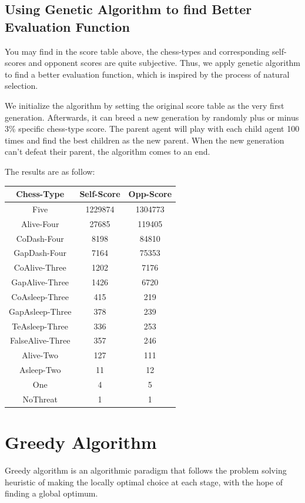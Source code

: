\documentclass[12pt,a4paper]{article}
\begin{document}
\subsection{Using Genetic Algorithm to find Better Evaluation Function}
You may find in the score table above, the chess-types and corresponding self-scores and opponent scores are quite subjective. Thus, we apply genetic algorithm to find a better evaluation function, which is inspired by the process of natural selection.

We initialize the algorithm by setting the original score table as the very first generation. Afterwards, it can breed a new generation by randomly plus or minus 3\% specific chess-type score. The parent agent will play with each child agent 100 times and find the best children as the new parent. When the new generation can't defeat their parent, the algorithm comes to an end.

The results are as follow:
\begin{table}[h]
\centering
\begin{tabular}{c|c|c}
\hline
Chess-Type&Self-Score&Opp-Score  \\
\hline
Five&1229874&1304773\\
Alive-Four&27685&119405\\
CoDash-Four&8198&84810\\
GapDash-Four&7164&75353\\
CoAlive-Three&1202&7176\\
GapAlive-Three&1426&6720\\
CoAsleep-Three&415&219\\
GapAsleep-Three&378&239\\
TeAsleep-Three&336&253\\
FalseAlive-Three&357&246\\
Alive-Two&127&111\\
Asleep-Two&11&12\\
One&4&5\\
NoThreat&1&1\\
\hline
\end{tabular}
\end{table}


\section{Greedy Algorithm}
Greedy algorithm is an algorithmic paradigm that follows the problem solving heuristic of making the locally optimal choice at each stage, with the hope of finding a global optimum.
\end{document}
